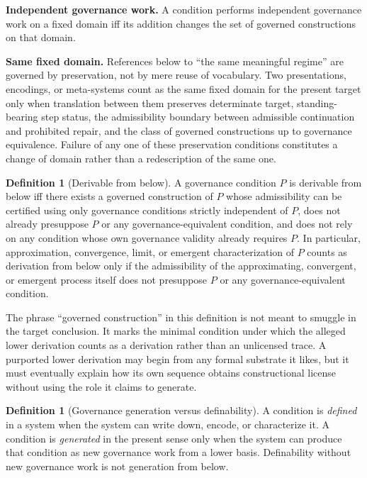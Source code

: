\documentclass[11pt]{article}
\theoremstyle{definition}
\newtheorem{definition}[theorem]{Definition}
\theoremstyle{remark}
\begin{document}
\medskip
\noindent\textbf{Independent governance work.} A condition performs independent governance work on a fixed domain iff its addition changes the set of governed constructions on that domain.

\medskip
\noindent\textbf{Same fixed domain.} References below to ``the same meaningful regime'' are governed by preservation, not by mere reuse of vocabulary. Two presentations, encodings, or meta-systems count as the same fixed domain for the present target only when translation between them preserves determinate target, standing-bearing step status, the admissibility boundary between admissible continuation and prohibited repair, and the class of governed constructions up to governance equivalence. Failure of any one of these preservation conditions constitutes a change of domain rather than a redescription of the same one.

\begin{definition}[Derivable from below]\label{def:derivable-from-below}
A governance condition $P$ is derivable from below iff there exists a governed construction of $P$ whose admissibility can be certified using only governance conditions strictly independent of $P$, does not already presuppose $P$ or any governance-equivalent condition, and does not rely on any condition whose own governance validity already requires $P$. In particular, approximation, convergence, limit, or emergent characterization of $P$ counts as derivation from below only if the admissibility of the approximating, convergent, or emergent process itself does not presuppose $P$ or any governance-equivalent condition.
\end{definition}

\noindent The phrase ``governed construction'' in this definition is not meant to smuggle in the target conclusion. It marks the minimal condition under which the alleged lower derivation counts as a derivation rather than an unlicensed trace. A purported lower derivation may begin from any formal substrate it likes, but it must eventually explain how its own sequence obtains constructional license without using the role it claims to generate.

\begin{definition}[Governance generation versus definability]\label{def:generation-definability}
A condition is \emph{defined} in a system when the system can write down, encode, or characterize it. A condition is \emph{generated} in the present sense only when the system can produce that condition as new governance work from a lower basis. Definability without new governance work is not generation from below.
\end{definition}
\end{document}

